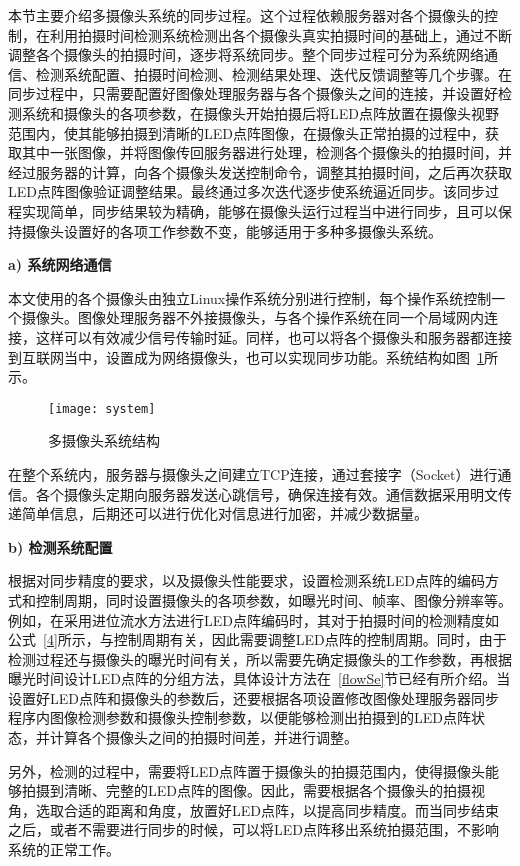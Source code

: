 本节主要介绍多摄像头系统的同步过程。这个过程依赖服务器对各个摄像头的控制，在利用拍摄时间检测系统检测出各个摄像头真实拍摄时间的基础上，通过不断调整各个摄像头的拍摄时间，逐步将系统同步。整个同步过程可分为系统网络通信、检测系统配置、拍摄时间检测、检测结果处理、迭代反馈调整等几个步骤。在同步过程中，只需要配置好图像处理服务器与各个摄像头之间的连接，并设置好检测系统和摄像头的各项参数，在摄像头开始拍摄后将LED点阵放置在摄像头视野范围内，使其能够拍摄到清晰的LED点阵图像，在摄像头正常拍摄的过程中，获取其中一张图像，并将图像传回服务器进行处理，检测各个摄像头的拍摄时间，并经过服务器的计算，向各个摄像头发送控制命令，调整其拍摄时间，之后再次获取LED点阵图像验证调整结果。最终通过多次迭代逐步使系统逼近同步。该同步过程实现简单，同步结果较为精确，能够在摄像头运行过程当中进行同步，且可以保持摄像头设置好的各项工作参数不变，能够适用于多种多摄像头系统。

\textbf{a) 系统网络通信}

本文使用的各个摄像头由独立Linux操作系统分别进行控制，每个操作系统控制一个摄像头。图像处理服务器不外接摄像头，与各个操作系统在同一个局域网内连接，这样可以有效减少信号传输时延。同样，也可以将各个摄像头和服务器都连接到互联网当中，设置成为网络摄像头，也可以实现同步功能。系统结构如图~\ref{system}所示。

\begin{figure}[h] 
  \centering
  \texttt{[image: system]}
  \caption{多摄像头系统结构}
    \label{system}
\end{figure}

在整个系统内，服务器与摄像头之间建立TCP连接，通过套接字（Socket）进行通信。各个摄像头定期向服务器发送心跳信号，确保连接有效。通信数据采用明文传递简单信息，后期还可以进行优化对信息进行加密，并减少数据量。

\textbf{b) 检测系统配置}

根据对同步精度的要求，以及摄像头性能要求，设置检测系统LED点阵的编码方式和控制周期，同时设置摄像头的各项参数，如曝光时间、帧率、图像分辨率等。例如，在采用进位流水方法进行LED点阵编码时，其对于拍摄时间的检测精度如公式~\ref{4}所示，与控制周期有关，因此需要调整LED点阵的控制周期。同时，由于检测过程还与摄像头的曝光时间有关，所以需要先确定摄像头的工作参数，再根据曝光时间设计LED点阵的分组方法，具体设计方法在~\ref{flowSe}节已经有所介绍。当设置好LED点阵和摄像头的参数后，还要根据各项设置修改图像处理服务器同步程序内图像检测参数和摄像头控制参数，以便能够检测出拍摄到的LED点阵状态，并计算各个摄像头之间的拍摄时间差，并进行调整。

另外，检测的过程中，需要将LED点阵置于摄像头的拍摄范围内，使得摄像头能够拍摄到清晰、完整的LED点阵的图像。因此，需要根据各个摄像头的拍摄视角，选取合适的距离和角度，放置好LED点阵，以提高同步精度。而当同步结束之后，或者不需要进行同步的时候，可以将LED点阵移出系统拍摄范围，不影响系统的正常工作。

